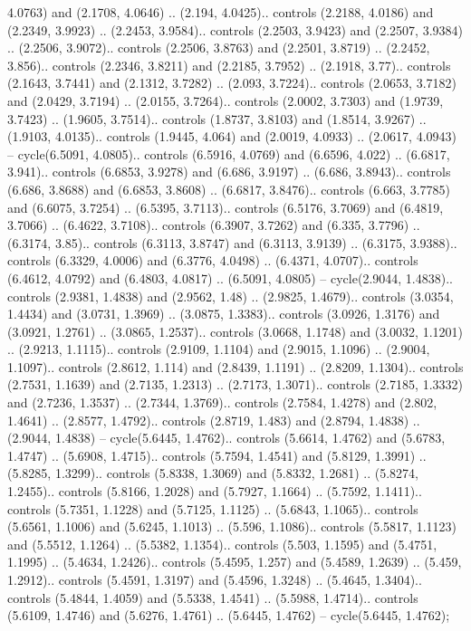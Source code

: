 4.0763) and (2.1708, 4.0646) .. (2.194, 4.0425).. controls (2.2188, 4.0186) and (2.2349, 3.9923) .. (2.2453, 3.9584).. controls (2.2503, 3.9423) and (2.2507, 3.9384) .. (2.2506, 3.9072).. controls (2.2506, 3.8763) and (2.2501, 3.8719) .. (2.2452, 3.856).. controls (2.2346, 3.8211) and (2.2185, 3.7952) .. (2.1918, 3.77).. controls (2.1643, 3.7441) and (2.1312, 3.7282) .. (2.093, 3.7224).. controls (2.0653, 3.7182) and (2.0429, 3.7194) .. (2.0155, 3.7264).. controls (2.0002, 3.7303) and (1.9739, 3.7423) .. (1.9605, 3.7514).. controls (1.8737, 3.8103) and (1.8514, 3.9267) .. (1.9103, 4.0135).. controls (1.9445, 4.064) and (2.0019, 4.0933) .. (2.0617, 4.0943) -- cycle(6.5091, 4.0805).. controls (6.5916, 4.0769) and (6.6596, 4.022) .. (6.6817, 3.941).. controls (6.6853, 3.9278) and (6.686, 3.9197) .. (6.686, 3.8943).. controls (6.686, 3.8688) and (6.6853, 3.8608) .. (6.6817, 3.8476).. controls (6.663, 3.7785) and (6.6075, 3.7254) .. (6.5395, 3.7113).. controls (6.5176, 3.7069) and (6.4819, 3.7066) .. (6.4622, 3.7108).. controls (6.3907, 3.7262) and (6.335, 3.7796) .. (6.3174, 3.85).. controls (6.3113, 3.8747) and (6.3113, 3.9139) .. (6.3175, 3.9388).. controls (6.3329, 4.0006) and (6.3776, 4.0498) .. (6.4371, 4.0707).. controls (6.4612, 4.0792) and (6.4803, 4.0817) .. (6.5091, 4.0805) -- cycle(2.9044, 1.4838).. controls (2.9381, 1.4838) and (2.9562, 1.48) .. (2.9825, 1.4679).. controls (3.0354, 1.4434) and (3.0731, 1.3969) .. (3.0875, 1.3383).. controls (3.0926, 1.3176) and (3.0921, 1.2761) .. (3.0865, 1.2537).. controls (3.0668, 1.1748) and (3.0032, 1.1201) .. (2.9213, 1.1115).. controls (2.9109, 1.1104) and (2.9015, 1.1096) .. (2.9004, 1.1097).. controls (2.8612, 1.114) and (2.8439, 1.1191) .. (2.8209, 1.1304).. controls (2.7531, 1.1639) and (2.7135, 1.2313) .. (2.7173, 1.3071).. controls (2.7185, 1.3332) and (2.7236, 1.3537) .. (2.7344, 1.3769).. controls (2.7584, 1.4278) and (2.802, 1.4641) .. (2.8577, 1.4792).. controls (2.8719, 1.483) and (2.8794, 1.4838) .. (2.9044, 1.4838) -- cycle(5.6445, 1.4762).. controls (5.6614, 1.4762) and (5.6783, 1.4747) .. (5.6908, 1.4715).. controls (5.7594, 1.4541) and (5.8129, 1.3991) .. (5.8285, 1.3299).. controls (5.8338, 1.3069) and (5.8332, 1.2681) .. (5.8274, 1.2455).. controls (5.8166, 1.2028) and (5.7927, 1.1664) .. (5.7592, 1.1411).. controls (5.7351, 1.1228) and (5.7125, 1.1125) .. (5.6843, 1.1065).. controls (5.6561, 1.1006) and (5.6245, 1.1013) .. (5.596, 1.1086).. controls (5.5817, 1.1123) and (5.5512, 1.1264) .. (5.5382, 1.1354).. controls (5.503, 1.1595) and (5.4751, 1.1995) .. (5.4634, 1.2426).. controls (5.4595, 1.257) and (5.4589, 1.2639) .. (5.459, 1.2912).. controls (5.4591, 1.3197) and (5.4596, 1.3248) .. (5.4645, 1.3404).. controls (5.4844, 1.4059) and (5.5338, 1.4541) .. (5.5988, 1.4714).. controls (5.6109, 1.4746) and (5.6276, 1.4761) .. (5.6445, 1.4762) -- cycle(5.6445, 1.4762);




